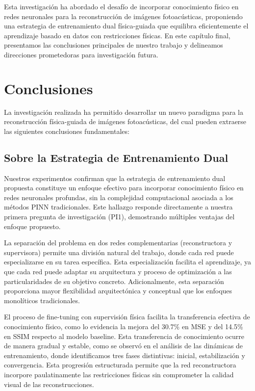 Esta investigación ha abordado el desafío de incorporar conocimiento físico en redes neuronales para la reconstrucción de imágenes fotoacústicas, proponiendo una estrategia de entrenamiento dual física-guiada que equilibra eficientemente el aprendizaje basado en datos con restricciones físicas. En este capítulo final, presentamos las conclusiones principales de nuestro trabajo y delineamos direcciones prometedoras para investigación futura.

\section{Conclusiones}

La investigación realizada ha permitido desarrollar un nuevo paradigma para la reconstrucción física-guiada de imágenes fotoacústicas, del cual pueden extraerse las siguientes conclusiones fundamentales:

\subsection{Sobre la Estrategia de Entrenamiento Dual}

Nuestros experimentos confirman que la estrategia de entrenamiento dual propuesta constituye un enfoque efectivo para incorporar conocimiento físico en redes neuronales profundas, sin la complejidad computacional asociada a los métodos PINN tradicionales. Este hallazgo responde directamente a nuestra primera pregunta de investigación (PI1), demostrando múltiples ventajas del enfoque propuesto.

La separación del problema en dos redes complementarias (reconstructora y supervisora) permite una división natural del trabajo, donde cada red puede especializarse en su tarea específica. Esta especialización facilita el aprendizaje, ya que cada red puede adaptar su arquitectura y proceso de optimización a las particularidades de su objetivo concreto. Adicionalmente, esta separación proporciona mayor flexibilidad arquitectónica y conceptual que los enfoques monolíticos tradicionales.

El proceso de fine-tuning con supervisión física facilita la transferencia efectiva de conocimiento físico, como lo evidencia la mejora del 30.7\% en MSE y del 14.5\% en SSIM respecto al modelo baseline. Esta transferencia de conocimiento ocurre de manera gradual y estable, como se observó en el análisis de las dinámicas de entrenamiento, donde identificamos tres fases distintivas: inicial, estabilización y convergencia. Esta progresión estructurada permite que la red reconstructora incorpore paulatinamente las restricciones físicas sin comprometer la calidad visual de las reconstrucciones.

